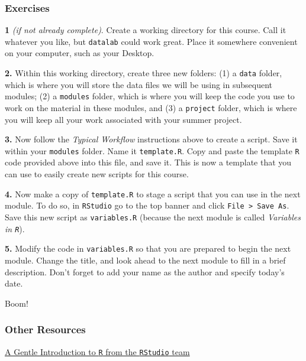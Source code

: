 \documentclass[
]{book}
\begin{document}
\hypertarget{exercises-1}{%
\subsubsection*{Exercises}\label{exercises-1}}

\textbf{1} \emph{(if not already complete)}. Create a working directory for this course. Call it whatever you like, but \texttt{datalab} could work great. Place it somewhere convenient on your computer, such as your Desktop.

\textbf{2.} Within this working directory, create three new folders: (1) a \texttt{data} folder, which is where you will store the data files we will be using in subsequent modules; (2) a \texttt{modules} folder, which is where you will keep the code you use to work on the material in these modules, and (3) a \texttt{project} folder, which is where you will keep all your work associated with your summer project.

\textbf{3.} Now follow the \emph{Typical Workflow} instructions above to create a script. Save it within your \texttt{modules} folder. Name it \texttt{template.R}. Copy and paste the template \texttt{R} code provided above into this file, and save it. This is now a template that you can use to easily create new scripts for this course.

\textbf{4.} Now make a copy of \texttt{template.R} to stage a script that you can use in the next module. To do so, in \texttt{RStudio} go to the top banner and click \texttt{File\ \textgreater{}\ Save\ As}. Save this new script as \texttt{variables.R} (because the next module is called \emph{Variables in \texttt{R}}).

\textbf{5.} Modify the code in \texttt{variables.R} so that you are prepared to begin the next module. Change the title, and look ahead to the next module to fill in a brief description. Don't forget to add your name as the author and specify today's date.

Boom!

\hypertarget{other-resources-1}{%
\subsubsection*{Other Resources}\label{other-resources-1}}

\href{https://www.rstudio.com/resources/webinars/a-gentle-introduction-to-tidy-statistics-in-r/}{A Gentle Introduction to \texttt{R} from the \texttt{RStudio} team}
\end{document}
